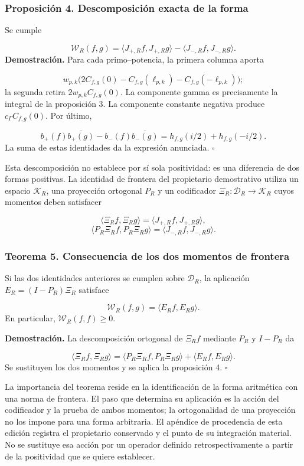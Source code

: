 \subsubsection*{Proposición 4. Descomposición exacta de la forma}
Se cumple

\[
\mathscr W_R(f,g)
=\langle J_{+,R}f,J_{+,R}g\rangle
-\langle J_{-,R}f,J_{-,R}g\rangle.
\]
\textbf{Demostración.} Para cada primo–potencia, la primera columna aporta

\[
w_{p,k}\bigl(2C_{f,g}(0)
-C_{f,g}(\ell_{p,k})-C_{f,g}(-\ell_{p,k})\bigr);
\]
la segunda retira \(2w_{p,k}C_{f,g}(0)\). La componente gamma es precisamente la integral de la proposición 3. La componente constante negativa produce \(c_\Gamma C_{f,g}(0)\). Por último,

\[
b_+(f)\overline{b_+(g)}-b_-(f)\overline{b_-(g)}
=h_{f,g}(i/2)+h_{f,g}(-i/2).
\]
La suma de estas identidades da la expresión anunciada. \hfill\(\square\)

Esta descomposición no establece por sí sola positividad: es una diferencia de dos formas positivas. La identidad de frontera del propietario demostrativo utiliza un espacio \(\mathcal K_R\), una proyección ortogonal \(P_R\) y un codificador \(\Xi_R:\mathcal D_R\to\mathcal K_R\) cuyos momentos deben satisfacer

\[
\langle\Xi_Rf,\Xi_Rg\rangle
=\langle J_{+,R}f,J_{+,R}g\rangle,
\]
\[
\langle P_R\Xi_Rf,P_R\Xi_Rg\rangle
=\langle J_{-,R}f,J_{-,R}g\rangle.
\]
\subsubsection*{Teorema 5. Consecuencia de los dos momentos de frontera}
Si las dos identidades anteriores se cumplen sobre \(\mathcal D_R\), la aplicación \(E_R=(I-P_R)\Xi_R\) satisface

\[
\mathscr W_R(f,g)=\langle E_Rf,E_Rg\rangle.
\]
En particular, \(\mathscr W_R(f,f)\geq0\).

\textbf{Demostración.} La descomposición ortogonal de \(\Xi_Rf\) mediante \(P_R\) y \(I-P_R\) da

\[
\langle\Xi_Rf,\Xi_Rg\rangle
=\langle P_R\Xi_Rf,P_R\Xi_Rg\rangle
+\langle E_Rf,E_Rg\rangle.
\]
Se sustituyen los dos momentos y se aplica la proposición 4. \hfill\(\square\)

La importancia del teorema reside en la identificación de la forma aritmética con una norma de frontera. El paso que determina su aplicación es la acción del codificador y la prueba de ambos momentos; la ortogonalidad de una proyección no los impone para una forma arbitraria. El apéndice de procedencia de esta edición registra el propietario conservado y el punto de su integración material. No se sustituye esa acción por un operador definido retrospectivamente a partir de la positividad que se quiere establecer.


